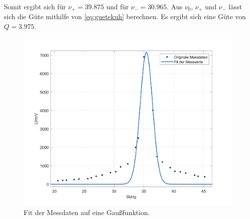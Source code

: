 Somit ergibt sich für $\nu_{+}=39.875$ und für $\nu_{-}=30.965$. 
Aus $\nu_{0}$, $\nu_{+}$ und $\nu_{-}$ lässt sich die Güte mithilfe von \autoref{eq:guetekuh}
berechnen. Es ergibt sich eine Güte von $Q=3.975$.
\begin{figure}[H]
  \centering
  \includegraphics[width=12cm]{fit.png}
  \caption{Fit der Messdaten auf eine Gaußfunktion.}
\end{figure}


